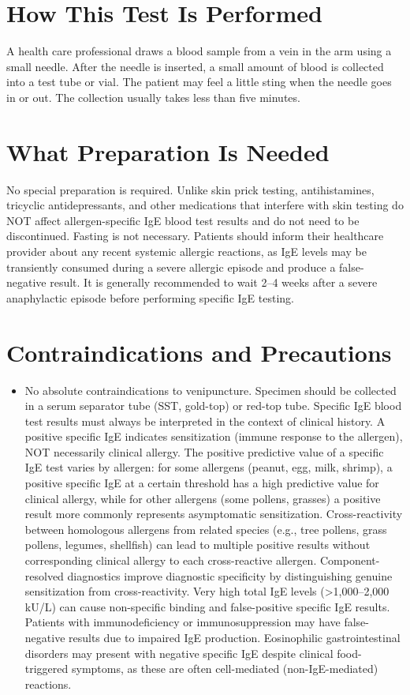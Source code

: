 \section*{How This Test Is Performed}
A health care professional draws a blood sample from a vein in the arm using a small needle. After the needle is inserted, a small amount of blood is collected into a test tube or vial. The patient may feel a little sting when the needle goes in or out. The collection usually takes less than five minutes.

\section*{What Preparation Is Needed}
No special preparation is required. Unlike skin prick testing, antihistamines, tricyclic antidepressants, and other medications that interfere with skin testing do NOT affect allergen-specific IgE blood test results and do not need to be discontinued. Fasting is not necessary. Patients should inform their healthcare provider about any recent systemic allergic reactions, as IgE levels may be transiently consumed during a severe allergic episode and produce a false-negative result. It is generally recommended to wait 2--4 weeks after a severe anaphylactic episode before performing specific IgE testing.

\section*{Contraindications and Precautions}
\begin{itemize}
  \item No absolute contraindications to venipuncture. Specimen should be collected in a serum separator tube (SST, gold-top) or red-top tube. Specific IgE blood test results must always be interpreted in the context of clinical history. A positive specific IgE indicates sensitization (immune response to the allergen), NOT necessarily clinical allergy. The positive predictive value of a specific IgE test varies by allergen: for some allergens (peanut, egg, milk, shrimp), a positive specific IgE at a certain threshold has a high predictive value for clinical allergy, while for other allergens (some pollens, grasses) a positive result more commonly represents asymptomatic sensitization. Cross-reactivity between homologous allergens from related species (e.g., tree pollens, grass pollens, legumes, shellfish) can lead to multiple positive results without corresponding clinical allergy to each cross-reactive allergen. Component-resolved diagnostics improve diagnostic specificity by distinguishing genuine sensitization from cross-reactivity. Very high total IgE levels (>1,000--2,000 kU/L) can cause non-specific binding and false-positive specific IgE results. Patients with immunodeficiency or immunosuppression may have false-negative results due to impaired IgE production. Eosinophilic gastrointestinal disorders may present with negative specific IgE despite clinical food-triggered symptoms, as these are often cell-mediated (non-IgE-mediated) reactions.
\end{itemize}

